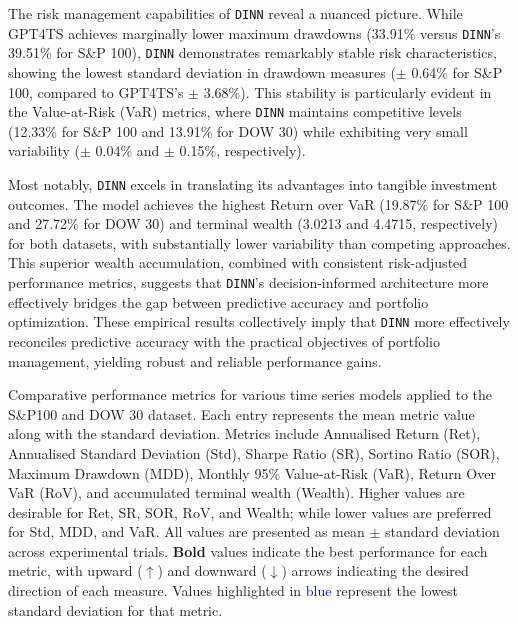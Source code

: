The risk management capabilities of \texttt{DINN} reveal a nuanced picture. While GPT4TS achieves marginally lower maximum drawdowns (33.91\% versus \texttt{DINN}'s 39.51\% for S\&P 100), \texttt{DINN} demonstrates remarkably stable risk characteristics, showing the lowest standard deviation in drawdown measures ($\pm$ 0.64\% for S\&P 100, compared to GPT4TS's $\pm$ 3.68\%). This stability is particularly evident in the Value-at-Risk (VaR) metrics, where \texttt{DINN} maintains competitive levels (12.33\% for S\&P 100 and 13.91\% for DOW 30) while exhibiting very small variability ($\pm$ 0.04\% and $\pm$ 0.15\%, respectively).

Most notably, \texttt{DINN} excels in translating its advantages into tangible investment outcomes. The model achieves the highest Return over VaR (19.87\% for S\&P 100 and 27.72\% for DOW 30) and terminal wealth (3.0213 and 4.4715, respectively) for both datasets, with substantially lower variability than competing approaches. This superior wealth accumulation, combined with consistent risk-adjusted performance metrics, suggests that \texttt{DINN}’s decision-informed architecture more effectively bridges the gap between predictive accuracy and portfolio optimization. These empirical results collectively imply that \texttt{DINN} more effectively reconciles predictive accuracy with the practical objectives of portfolio management, yielding robust and reliable performance gains.

\begin{table}[!htbp]
\centering

\captionsetup{font=footnotesize}
\caption{Comparative performance metrics for various time series models applied to the S\&P100 and DOW 30 dataset. Each entry represents the mean metric value along with the standard deviation. Metrics include Annualised Return (Ret), Annualised Standard Deviation (Std), Sharpe Ratio (SR), Sortino Ratio (SOR), Maximum Drawdown (MDD), Monthly 95\% Value-at-Risk (VaR), Return Over VaR (RoV), and accumulated terminal wealth (Wealth). Higher values are desirable for Ret, SR, SOR, RoV, and Wealth; while lower values are preferred for Std, MDD, and VaR. All values are presented as mean $\pm$ standard deviation across experimental trials. \textbf{Bold} values indicate the best performance for each metric, with upward ($\uparrow$) and downward ($\downarrow$) arrows indicating the desired direction of each measure. Values highlighted in \textcolor{blue}{blue} represent the lowest standard deviation for that metric.}
\label{tab1:main_result}
\vspace{-0.5cm}
\end{table}



